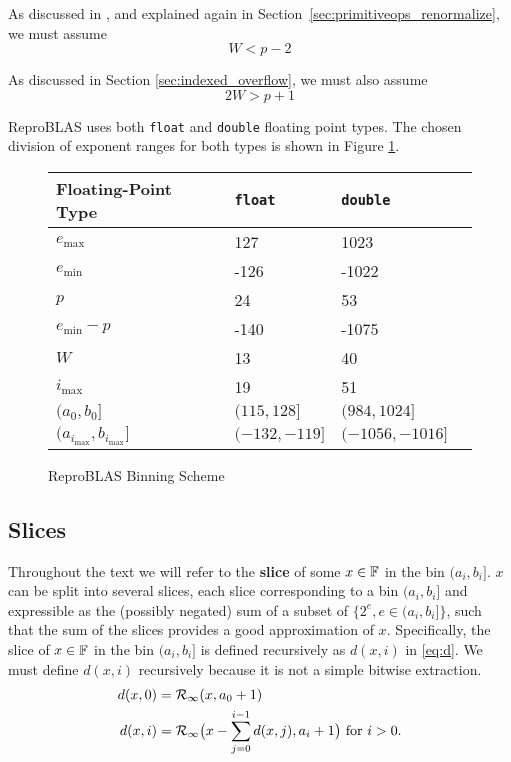     As discussed in \cite{repsum}, and explained again in Section~\ref{sec:primitiveops_renormalize},
    we must assume
    \begin{equation}
      W < p - 2
      \label{eq:wupper}
    \end{equation}

    As discussed in Section \ref{sec:indexed_overflow}, we must also assume
    \begin{equation}
      2 W > p + 1
      \label{eq:wlower}
    \end{equation}

    ReproBLAS uses both \texttt{float} and \texttt{double} floating point
    types. The chosen division of exponent ranges for both types is shown in
    Figure \ref{fig:bins}.

    \begin{figure}[H]
        \centering
        \begin{tabular}{ | l | l | l | p{5cm} |} \hline
            Floating-Point Type & \texttt{float} & \texttt{double}\\ \hline
            $e_{\max}$ & 127 & 1023\\ \hline
            $e_{\min}$ &  -126 & -1022 \\ \hline
            $p$ & 24 & 53 \\ \hline
            $e_{\min} - p$ & -140 & -1075 \\ \hline
            $W$ & 13 & 40 \\ \hline
            $i_{\max}$ & 19 & 51 \\ \hline
            $(a_0, b_0]$ & $(115, 128]$ & $(984, 1024]$\\ \hline
            $(a_{i_{\max}}, b_{i_{\max}}]$ & $(-132, -119]$ & $(-1056, -1016]$ \\ \hline
        \end{tabular}
        \caption{ReproBLAS Binning Scheme}
        \label{fig:bins}
    \end{figure}

    \subsection{Slices}
    \label{sec:binning_slices}
    Throughout the text we will refer to the \textbf{slice} of some $x \in \mathbb{F}$
    in the bin $(a_i, b_i]$. $x$ can be split into several slices, each slice
    corresponding to a bin $(a_i, b_i]$ and expressible as the (possibly
    negated) sum of a subset of $\{2^e, e \in (a_i, b_i]\}$, such that the sum
    of the slices provides a good approximation of $x$. Specifically, the slice
    of $x \in \mathbb{F}$ in the bin $(a_i, b_i]$ is defined recursively as $d(x, i)$
    in \eqref{eq:d}. We must define $d(x, i)$ recursively because it is not a
    simple bitwise extraction.
    \begin{equation}
      \begin{aligned}
      d(x,0) & = \mathcal{R}_\text{$\infty$}(x, a_0+1) \\
      d(x, i) & = \mathcal{R}_\text{$\infty$}\bigl(x - \sum\limits_{j=0}^{i - 1}d(x,j), a_i + 1\bigr)
        \text{ for } i > 0.
      \end{aligned}
      \label{eq:d}
    \end{equation}

